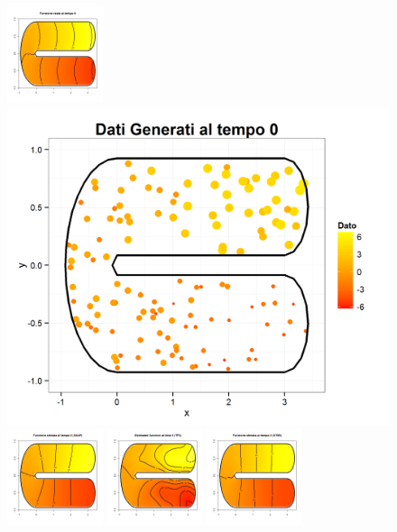 \documentclass[a4paper,11pt,twoside,openright]{book}							%
\begin{document}
\begin{landscape}
\begin{figure}
\centering
\includegraphics[width=0.25\textwidth]{immagini/simulazioni_covar/REALEtempo1.png}
\includegraphics[height=0.25\textwidth]{immagini/simulazioni_covar/Dati_tempo1.png}
\includegraphics[width=0.25\textwidth]{immagini/simulazioni_covar/SOAPtempo1.png}
\includegraphics[width=0.25\textwidth]{immagini/simulazioni_covar/TPStempo1.png}
\includegraphics[width=0.25\textwidth]{immagini/simulazioni_covar/STSRtempo1.png}


\end{figure}
\end{landscape}
\end{document}
